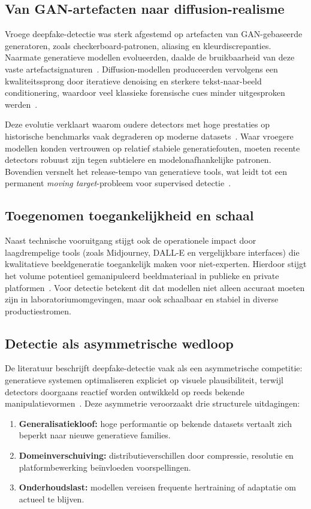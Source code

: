 \subsection{Van GAN-artefacten naar diffusion-realisme}
Vroege deepfake-detectie was sterk afgestemd op artefacten van GAN-gebaseerde generatoren, zoals checkerboard-patronen, aliasing en kleurdiscrepanties. Naarmate generatieve modellen evolueerden, daalde de bruikbaarheid van deze vaste artefactsignaturen~\autocite{Pei2024}. Diffusion-modellen produceerden vervolgens een kwaliteitssprong door iteratieve denoising en sterkere tekst-naar-beeld conditionering, waardoor veel klassieke forensische cues minder uitgesproken werden~\autocite{TowardsDiffusion2024}.

Deze evolutie verklaart waarom oudere detectors met hoge prestaties op historische benchmarks vaak degraderen op moderne datasets~\autocite{EvaluationModels2025}. Waar vroegere modellen konden vertrouwen op relatief stabiele generatiefouten, moeten recente detectors robuust zijn tegen subtielere en modelonafhankelijke patronen. Bovendien versnelt het release-tempo van generatieve tools, wat leidt tot een permanent \emph{moving target}-probleem voor supervised detectie~\autocite{Hasan2026}.

\subsection{Toegenomen toegankelijkheid en schaal}
Naast technische vooruitgang stijgt ook de operationele impact door laagdrempelige tools (zoals Midjourney, DALL-E en vergelijkbare interfaces) die kwalitatieve beeldgeneratie toegankelijk maken voor niet-experten. Hierdoor stijgt het volume potentieel gemanipuleerd beeldmateriaal in publieke en private platformen~\autocite{Pei2024}. Voor detectie betekent dit dat modellen niet alleen accuraat moeten zijn in laboratoriumomgevingen, maar ook schaalbaar en stabiel in diverse productiestromen.

\subsection{Detectie als asymmetrische wedloop}
De literatuur beschrijft deepfake-detectie vaak als een asymmetrische competitie: generatieve systemen optimaliseren expliciet op visuele plausibiliteit, terwijl detectors doorgaans reactief worden ontwikkeld op reeds bekende manipulatievormen~\autocite{Hasan2026}. Deze asymmetrie veroorzaakt drie structurele uitdagingen:
\begin{enumerate}
  \item \textbf{Generalisatiekloof:} hoge performantie op bekende datasets vertaalt zich beperkt naar nieuwe generatieve families.
  \item \textbf{Domeinverschuiving:} distributieverschillen door compressie, resolutie en platformbewerking beïnvloeden voorspellingen.
  \item \textbf{Onderhoudslast:} modellen vereisen frequente hertraining of adaptatie om actueel te blijven.
\end{enumerate}

